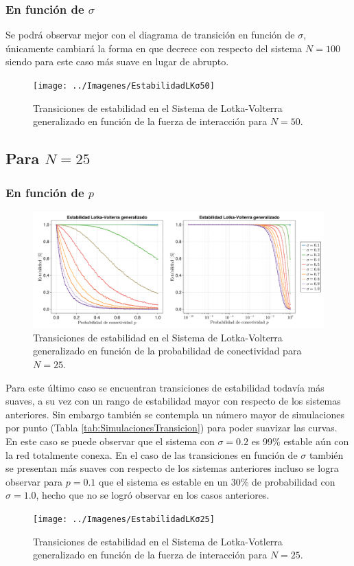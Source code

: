 \subsubsection*{En función de $\sigma$}

Se podrá observar mejor con el diagrama de transición en función de $\sigma$, únicamente cambiará la forma en que decrece con respecto del sistema $N=100$ siendo para este caso más suave en lugar de abrupto.
\begin{figure}[h!]
	\centering
	\texttt{[image: ../Imagenes/EstabilidadLKσ50]}
	\caption{Transiciones de estabilidad en el Sistema de Lotka-Volterra generalizado en función de la fuerza de interacción para $N=50$.}
	\label{fig:EstabilidadLKσ50}
\end{figure}

\subsection{Para $N=25$}

\subsubsection*{En función de $p$}

\begin{figure}[h!]
	\centering
	\includegraphics[scale=0.16]{../Imagenes/EstabilidadLKp25}
	\caption{Transiciones de estabilidad en el Sistema de Lotka-Volterra generalizado en función de la probabilidad de conectividad para $N=25$.}
	\label{fig:EstabilidadLKp25}
\end{figure}

Para este último caso se encuentran transiciones de estabilidad todavía más suaves, a su vez con un rango de estabilidad mayor con respecto de los sistemas anteriores. Sin embargo también se contempla un número mayor de simulaciones por punto (Tabla \ref{tab:SimulacionesTransicion}) para poder suavizar las curvas. En este caso se puede observar que el sistema con $\sigma=0.2$ es 99\% estable aún con la red totalmente conexa. En el caso de las transiciones en función de $\sigma$ también se presentan más suaves con respecto de los sistemas anteriores incluso se logra observar para $p=0.1$ que el sistema es estable en un 30\% de probabilidad con $\sigma=1.0$, hecho que no se logró observar en los casos anteriores.
\begin{figure}[h!]
	\centering
	\texttt{[image: ../Imagenes/EstabilidadLKσ25]}
	\caption{Transiciones de estabilidad en el Sistema de Lotka-Votlerra generalizado en función de la fuerza de interacción para $N=25$.}
	\label{fig:EstabilidadLKσ25}
\end{figure}


